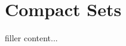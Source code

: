 \documentclass[../../templates/section]{subfiles}
\begin{document}
\section{Compact Sets}\label{sec:compact-sets}

filler content...
\end{document}
